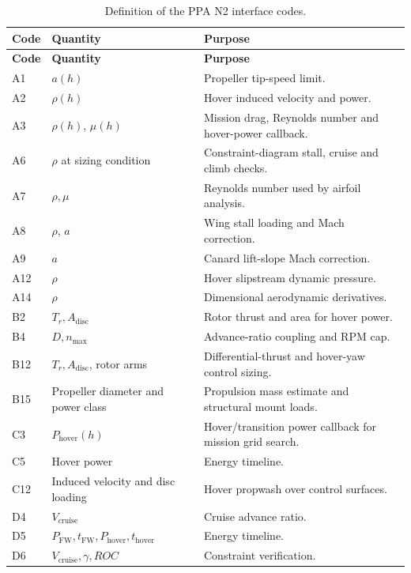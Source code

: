 \begin{longtable}{@{}p{}p{}p{}@{}}
\caption{Definition of the PPA N2 interface codes.}
\label{tab:ppa_n2_codes}\\
\toprule
\textbf{Code} & \textbf{Quantity} & \textbf{Purpose} \\
\midrule
\endfirsthead
\toprule
\textbf{Code} & \textbf{Quantity} & \textbf{Purpose} \\
\midrule
\endhead
\bottomrule
\endfoot
A1 & \(a(h)\) & Propeller tip-speed limit. \\
A2 & \(\rho(h)\) & Hover induced velocity and power. \\
A3 & \(\rho(h)\), \(\mu(h)\) & Mission drag, Reynolds number and hover-power callback. \\
A6 & \(\rho\) at sizing condition & Constraint-diagram stall, cruise and climb checks. \\
A7 & \(\rho,\mu\) & Reynolds number used by airfoil analysis. \\
A8 & \(\rho\), \(a\) & Wing stall loading and Mach correction. \\
A9 & \(a\) & Canard lift-slope Mach correction. \\
A12 & \(\rho\) & Hover slipstream dynamic pressure. \\
A14 & \(\rho\) & Dimensional aerodynamic derivatives. \\
B2 & \(T_r,A_{\mathrm{disc}}\) & Rotor thrust and area for hover power. \\
B4 & \(D,n_{\max}\) & Advance-ratio coupling and RPM cap. \\
B12 & \(T_r,A_{\mathrm{disc}}\), rotor arms & Differential-thrust and hover-yaw control sizing. \\
B15 & Propeller diameter and power class & Propulsion mass estimate and structural mount loads. \\
C3 & \(P_{\mathrm{hover}}(h)\) & Hover/transition power callback for mission grid search. \\
C5 & Hover power & Energy timeline. \\
C12 & Induced velocity and disc loading & Hover propwash over control surfaces. \\
D4 & \(V_{\mathrm{cruise}}\) & Cruise advance ratio. \\
D5 & \(P_{\mathrm{FW}},t_{\mathrm{FW}},P_{\mathrm{hover}},t_{\mathrm{hover}}\) & Energy timeline. \\
D6 & \(V_{\mathrm{cruise}},\gamma,ROC\) & Constraint verification. \\

\end{longtable}
